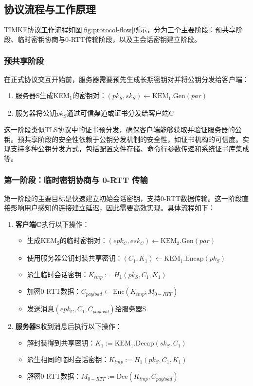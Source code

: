 \subsection{协议流程与工作原理}

TIMKE协议工作流程如图\ref{fig:protocol-flow}所示，分为三个主要阶段：预共享阶段、临时密钥协商与0-RTT传输阶段，以及主会话密钥建立阶段。

\subsubsection{预共享阶段}
在正式协议交互开始前，服务器需要预先生成长期密钥对并将公钥分发给客户端：

\begin{enumerate}
    \item 服务器S生成KEM\textsubscript{1}的密钥对：$(pk_S, sk_S) \leftarrow \text{KEM}_1.\text{Gen}(par)$
    \item 服务器将公钥$pk_S$通过可信渠道或证书分发给客户端C
\end{enumerate}

这一阶段类似TLS协议中的证书预分发，确保客户端能够获取并验证服务器的公钥。预共享阶段的安全性依赖于公钥分发机制的安全性，如证书机构的可信度。实现支持多种公钥分发方式，包括配置文件存储、命令行参数传递和系统证书库集成等。


\subsubsection{第一阶段：临时密钥协商与 0-RTT 传输}

第一阶段的主要目标是快速建立初始会话密钥，支持0-RTT数据传输。这一阶段直接影响用户感知的连接建立延迟，因此需要高效实现。具体流程如下：

\begin{enumerate}
    \item \textbf{客户端C}执行以下操作：
    \begin{itemize}
        \item 生成KEM\textsubscript{2}的临时密钥对：$(epk_C, esk_C) \leftarrow \text{KEM}_2.\text{Gen}(par)$
        \item 使用服务器公钥封装共享密钥：$(C_1, K_1) \leftarrow \text{KEM}_1.\text{Encap}(pk_S)$
        \item 派生临时会话密钥：$K_{tmp} := H_1(pk_S, C_1, K_1)$
        \item 加密0-RTT数据：$C_{payload} \leftarrow \text{Enc}(K_{tmp}; M_{0-RTT})$
        \item 发送消息$(epk_C, C_1, C_{payload})$给服务器S
    \end{itemize}

    \item \textbf{服务器S}收到消息后执行以下操作：
    \begin{itemize}
        \item 解封装得到共享密钥：$K_1 := \text{KEM}_1.\text{Decap}(sk_S, C_1)$
        \item 派生相同的临时会话密钥：$K_{tmp} := H_1(pk_S, C_1, K_1)$
        \item 解密0-RTT数据：$M_{0-RTT} := \text{Dec}(K_{tmp}, C_{payload})$
    \end{itemize}
\end{enumerate}

